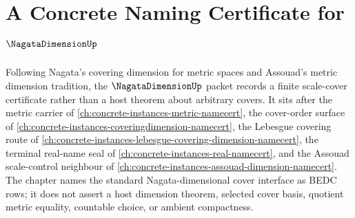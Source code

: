 \chapter{A Concrete Naming Certificate for $\NagataDimensionUp$}
\label{ch:concrete-instances-nagata-dimension-namecert}

Following Nagata's covering dimension for metric spaces and Assouad's metric dimension tradition, the $\NagataDimensionUp$ packet records a finite scale-cover certificate rather than a host theorem about arbitrary covers. It sits after the metric carrier of \autoref{ch:concrete-instances-metric-namecert}, the cover-order surface of \autoref{ch:concrete-instances-coveringdimension-namecert}, the Lebesgue covering route of \autoref{ch:concrete-instances-lebesgue-covering-dimension-namecert}, the terminal real-name seal of \autoref{ch:concrete-instances-real-namecert}, and the Assouad scale-control neighbour of \autoref{ch:concrete-instances-assouad-dimension-namecert}. The chapter names the standard Nagata-dimensional cover interface as BEDC rows; it does not assert a host dimension theorem, selected cover basis, quotient metric equality, countable choice, or ambient compactness.

